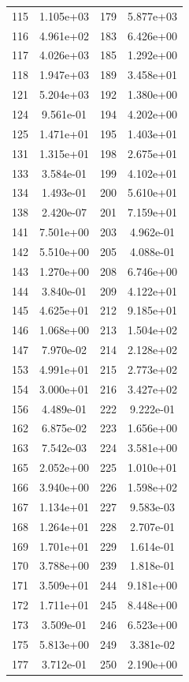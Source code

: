 \documentclass[12pt]{article}
\begin{document}
\begin{longtable}{@{}cccc@{}}
115 & 1.105e+03 & 179 & 5.877e+03 \\
116 & 4.961e+02 & 183 & 6.426e+00 \\
117 & 4.026e+03 & 185 & 1.292e+00 \\
118 & 1.947e+03 & 189 & 3.458e+01 \\
121 & 5.204e+03 & 192 & 1.380e+00 \\
124 & 9.561e-01 & 194 & 4.202e+00 \\
125 & 1.471e+01 & 195 & 1.403e+01 \\
131 & 1.315e+01 & 198 & 2.675e+01 \\
133 & 3.584e-01 & 199 & 4.102e+01 \\
134 & 1.493e-01 & 200 & 5.610e+01 \\
138 & 2.420e-07 & 201 & 7.159e+01 \\
141 & 7.501e+00 & 203 & 4.962e-01 \\
142 & 5.510e+00 & 205 & 4.088e-01 \\
143 & 1.270e+00 & 208 & 6.746e+00 \\
144 & 3.840e-01 & 209 & 4.122e+01 \\
145 & 4.625e+01 & 212 & 9.185e+01 \\
146 & 1.068e+00 & 213 & 1.504e+02 \\
147 & 7.970e-02 & 214 & 2.128e+02 \\
153 & 4.991e+01 & 215 & 2.773e+02 \\
154 & 3.000e+01 & 216 & 3.427e+02 \\
156 & 4.489e-01 & 222 & 9.222e-01 \\
162 & 6.875e-02 & 223 & 1.656e+00 \\
163 & 7.542e-03 & 224 & 3.581e+00 \\
165 & 2.052e+00 & 225 & 1.010e+01 \\
166 & 3.940e+00 & 226 & 1.598e+02 \\
167 & 1.134e+01 & 227 & 9.583e-03 \\
168 & 1.264e+01 & 228 & 2.707e-01 \\
169 & 1.701e+01 & 229 & 1.614e-01 \\
170 & 3.788e+00 & 239 & 1.818e-01 \\
171 & 3.509e+01 & 244 & 9.181e+00 \\
172 & 1.711e+01 & 245 & 8.448e+00 \\
173 & 3.509e-01 & 246 & 6.523e+00 \\
175 & 5.813e+00 & 249 & 3.381e-02 \\
177 & 3.712e-01 & 250 & 2.190e+00 \\

\end{longtable}
\end{document}
